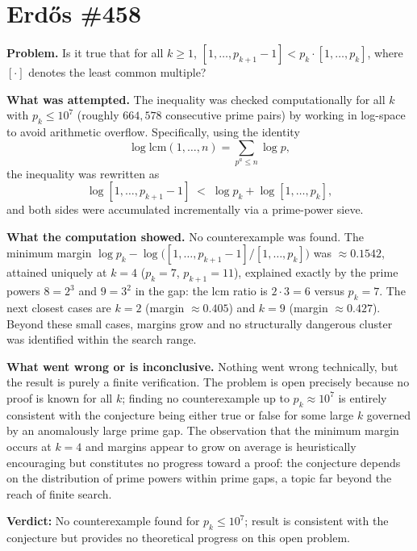 \section{Erdős \#458}

\textbf{Problem.} Is it true that for all $k \geq 1$, $[1,\ldots,p_{k+1}-1] < p_k \cdot [1,\ldots,p_k]$, where $[\cdot]$ denotes the least common multiple?

\textbf{What was attempted.} The inequality was checked computationally for all $k$ with $p_k \leq 10^7$ (roughly $664{,}578$ consecutive prime pairs) by working in log-space to avoid arithmetic overflow. Specifically, using the identity
\[
\log \mathrm{lcm}(1,\ldots,n) = \sum_{p^a \leq n} \log p,
\]
the inequality was rewritten as
\[
\log[1,\ldots,p_{k+1}-1] \;<\; \log p_k + \log[1,\ldots,p_k],
\]
and both sides were accumulated incrementally via a prime-power sieve.

\textbf{What the computation showed.} No counterexample was found. The minimum margin $\log p_k - \log\!\bigl([1,\ldots,p_{k+1}-1]/[1,\ldots,p_k]\bigr)$ was $\approx 0.1542$, attained uniquely at $k=4$ ($p_k=7$, $p_{k+1}=11$), explained exactly by the prime powers $8=2^3$ and $9=3^2$ in the gap: the lcm ratio is $2\cdot 3=6$ versus $p_k=7$. The next closest cases are $k=2$ (margin $\approx 0.405$) and $k=9$ (margin $\approx 0.427$). Beyond these small cases, margins grow and no structurally dangerous cluster was identified within the search range.

\textbf{What went wrong or is inconclusive.} Nothing went wrong technically, but the result is purely a finite verification. The problem is open precisely because no proof is known for all $k$; finding no counterexample up to $p_k \approx 10^7$ is entirely consistent with the conjecture being either true or false for some large $k$ governed by an anomalously large prime gap. The observation that the minimum margin occurs at $k=4$ and margins appear to grow on average is heuristically encouraging but constitutes no progress toward a proof: the conjecture depends on the distribution of prime powers within prime gaps, a topic far beyond the reach of finite search.

\textbf{Verdict:} No counterexample found for $p_k \leq 10^7$; result is consistent with the conjecture but provides no theoretical progress on this open problem.